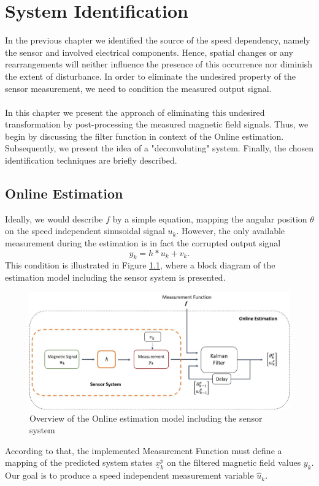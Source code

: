 \documentclass[english]{isasthesis}
\begin{document}
    \chapter{System Identification} \label{system identification}
    	In the previous chapter we identified the source of the speed dependency, namely the sensor and involved electrical components. Hence, spatial changes or any rearrangements will neither influence the presence of this occurrence nor diminish the extent of disturbance. In order to eliminate the undesired property of the sensor measurement, we need to condition the measured output signal. \\\\
    	In this chapter we present the approach of eliminating this undesired transformation by post-processing the measured magnetic field signals. Thus, we begin by discussing the filter function in context of the Online estimation. Subsequently, we present the idea of a "deconvoluting" system. Finally, the chosen identification techniques are briefly described. 
    	\section{Online Estimation}
    	Ideally, we would describe $f$ by a simple equation, mapping the angular position $\theta$ on the speed independent sinusoidal signal $u_k$. However, the only available measurement during the estimation is in fact the corrupted output signal
    		\begin{equation}
    			y_k = h * u_k + v_k.
    		\end{equation}
    		This condition is illustrated in Figure \ref{fig:classification sensor system}, where a block diagram of the estimation model including the sensor system is presented. 
    		\begin{figure}[t]
    		\begin{center}
    			\includegraphics[width=1\textwidth]{figures/sensor_system_online_2.jpg}   
  			\end{center}
    		\caption{Overview of the Online estimation model including the sensor system}
    		\label{fig:classification sensor system}
    		\end{figure}
    		According to that, the implemented Measurement Function must define a mapping of the predicted system states $\underline{x}_k^p$ on the filtered magnetic field values $y_k$. Our goal is to produce a speed independent measurement variable $\hat{u}_k$.\\\\
 			
\end{document}
